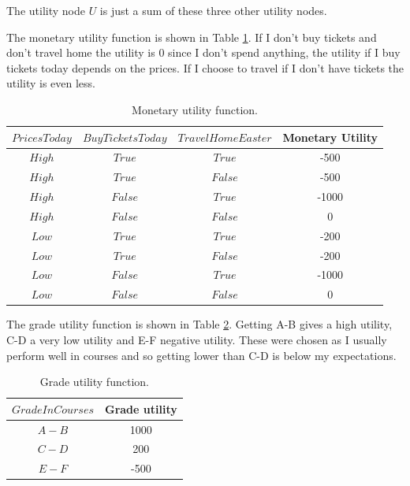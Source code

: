 \documentclass[11pt, a4paper, english]{../Template/NTNUoving}
\begin{document}
\begin{oppgave}
    The utility node $U$ is just a sum of these three other utility nodes.

    The monetary utility function is shown in Table \ref{tab:MU}. If I don't buy tickets and don't travel home the
    utility is 0 since I don't spend anything, the utility if I buy tickets today depends on the prices. If I choose to travel
    if I don't have tickets the utility is even less.

    \begin{table}[H]
        \centering
        \begin{tabular}{|c|c|c|c|}
            \hline
            $PricesToday$ & $BuyTicketsToday$ & $TravelHomeEaster$ & Monetary Utility \\
            \hline
            $High$ & $True$ & $True$ & -500 \\ [1.0ex]
            $High$ & $True$ & $False$ & -500 \\ [1.0ex]
            $High$ & $False$ & $True$  & -1000 \\ [1.0ex]
            $High$ & $False$ & $False$  & 0 \\ [1.0ex]
            $Low$ & $True$ & $True$  & -200 \\ [1.0ex]
            $Low$ & $True$ & $False$  & -200 \\ [1.0ex]
            $Low$ & $False$ & $True$  & -1000 \\ [1.0ex]
            $Low$ & $False$ & $False$  & 0 \\ [1.0ex]
            \hline
        \end{tabular}
        \caption{Monetary utility function.}
        \label{tab:MU}
    \end{table}

    The grade utility function is shown in Table \ref{tab:GU}. Getting A-B gives a high utility, C-D a very low utility and E-F negative utility.
    These were chosen as I usually perform well in courses and so getting lower than C-D is below my expectations.

    \begin{table}[H]
        \centering
        \begin{tabular}{|c|c|}
            \hline
            $GradeInCourses$ & Grade utility  \\
            \hline
            $A-B$ & 1000 \\ [1.0ex]
            $C-D$ & 200 \\ [1.0ex]
            $E-F$ & -500 \\ [1.0ex]
            \hline
        \end{tabular}
        \caption{Grade utility function.}
        \label{tab:GU}
    \end{table}


\end{oppgave}
\end{document}
